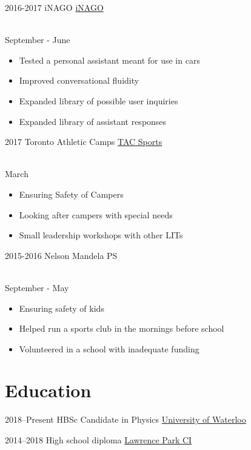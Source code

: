 \documentclass[]{cv-style}          %
\begin{document}
\begin{entrylist}
\entry
  {2016-2017}
  {iNAGO}
  {\href{http://www.inago.com/company-inago/}{iNAGO}}
  {\\
  September - June
  \begin{itemize}
      \item Tested a personal assistant meant for use in cars
      \item Improved conversational fluidity
      \item Expanded library of possible user inquiries
      \item Expanded library of assistant responses
  \end{itemize}}
  
\entry
    {2017}
    {Toronto Athletic Camps}
    {\href{https://tacsports.ca/}{TAC Sports}}
    {\\
    March
    \begin{itemize}
        \item Ensuring Safety of Campers
        \item Looking after campers with special needs
        \item Small leadership workshops with other LITs
    \end{itemize}
    }
\entry
    {2015-2016}
    {Nelson Mandela PS}
    {}
    {\\
    September - May
    \begin{itemize}
        \item Ensuring safety of kids
        \item Helped run a sports club in the mornings before school
        \item Volunteered in a school with inadequate funding
    \end{itemize}}
\end{entrylist}


\section{Education}

\begin{entrylist}
\entry
{2018--Present}
{HBSc {\normalfont Candidate in Physics}}
{\href{https://uwaterloo.ca/}{University of Waterloo}}
{\vspace{-0.3cm}}

\entry
{2014--2018}
{{\normalfont High school diploma}}
{\href{https://schoolweb.tdsb.on.ca/lawrenceparkci}{Lawrence Park CI}}
{\vspace{-0.3cm}}

\end{entrylist}
\end{document}
